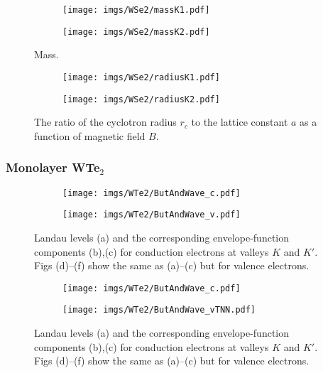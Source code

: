\documentclass{article}
\begin{document}
\begin{figure}[htb]
	\begin{subfigure}{0.495\textwidth}
		\centering
		\texttt{[image: imgs/WSe2/massK1.pdf]}
	\end{subfigure}
	\begin{subfigure}{0.495\textwidth}
		\centering
		\texttt{[image: imgs/WSe2/massK2.pdf]}
	\end{subfigure}
	\caption{Mass.}
\end{figure}
\begin{figure}[!h]
	\begin{subfigure}{0.495\textwidth}
		\centering
		\texttt{[image: imgs/WSe2/radiusK1.pdf]}
	\end{subfigure}
	\begin{subfigure}{0.495\textwidth}
		\centering
		\texttt{[image: imgs/WSe2/radiusK2.pdf]}
	\end{subfigure}
	\caption{The ratio of the cyclotron radius $r_c$ to the lattice constant $a$ as a function of magnetic field $B$.}
\end{figure}


\newpage
\subsubsection*{Monolayer WTe$_{2}$}
\begin{figure}[htb]
	\begin{subfigure}{0.495\textwidth}
		\centering
		\texttt{[image: imgs/WTe2/ButAndWave\_c.pdf]}
	\end{subfigure}
	\begin{subfigure}{0.495\textwidth}
		\centering
		\texttt{[image: imgs/WTe2/ButAndWave\_v.pdf]}
	\end{subfigure}
	\caption{Landau levels (a) and the corresponding envelope-function components (b),(c) for conduction electrons at valleys $K$ and $K'$. Figs (d)–(f) show the same as (a)–(c) but for valence electrons.}
\end{figure}
\begin{figure}[!h]
	\begin{subfigure}{0.495\textwidth}
		\centering
		\texttt{[image: imgs/WTe2/ButAndWave\_c.pdf]}
	\end{subfigure}
	\begin{subfigure}{0.495\textwidth}
		\centering
		\texttt{[image: imgs/WTe2/ButAndWave\_vTNN.pdf]}
	\end{subfigure}
	\caption{Landau levels (a) and the corresponding envelope-function components (b),(c) for conduction electrons at valleys $K$ and $K'$. Figs (d)–(f) show the same as (a)–(c) but for valence electrons.}
\end{figure}
\end{document}
